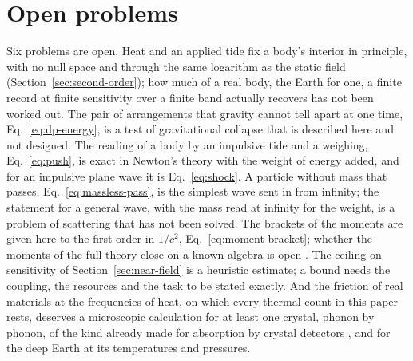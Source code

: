 \section{Open problems}\label{sec:status}

Six problems are open. Heat and an
applied tide fix a body's interior in principle, with no null space and through the
same logarithm as the static field (Section~\ref{sec:second-order}); how much of a real
body, the Earth for one, a finite record at finite sensitivity over a finite
band actually recovers has not been worked out. The pair of arrangements that
gravity cannot tell apart at one time, Eq.~\eqref{eq:dp-energy}, is a test of gravitational
collapse that is described here and not designed. The reading of a body by
an impulsive tide and a weighing, Eq.~\eqref{eq:push}, is exact in Newton's theory with
the weight of energy added, and for an impulsive plane wave it is
Eq.~\eqref{eq:shock}. A particle without mass that passes,
Eq.~\eqref{eq:massless-pass}, is the simplest wave sent in from infinity; the
statement for a general wave, with the mass read at infinity for the weight,
is a problem of scattering that has not been solved. The brackets of the
moments are given here to the first order in $1/c^2$,
Eq.~\eqref{eq:moment-bracket}; whether the moments of the full theory close
on a known algebra is open \cite{CompereOliveriSeraj2018}. The ceiling on
sensitivity of Section~\ref{sec:near-field} is a heuristic estimate; a bound
needs the coupling, the resources and the task to be stated exactly. And the
friction of real materials at the frequencies of heat, on which every thermal
count in this paper rests, deserves a microscopic calculation for at least one
crystal, phonon by phonon, of the kind already made for absorption by crystal
detectors \cite{KahnSchutteEngelTrickle2024}, and for the deep Earth at its
temperatures and pressures.
